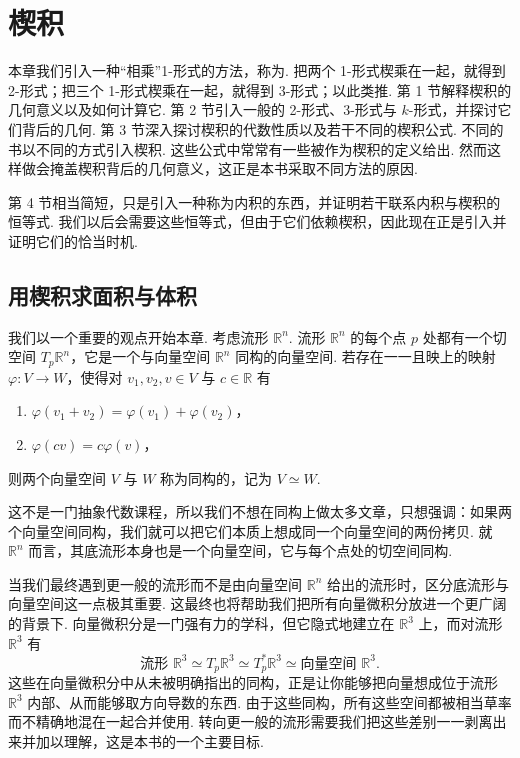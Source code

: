 \chapter{楔积}

本章我们引入一种``相乘''1-形式的方法，称为. 把两个 1-形式楔乘在一起，就得到 2-形式；把三个 1-形式楔乘在一起，就得到 3-形式；以此类推. 第 1 节解释楔积的几何意义以及如何计算它. 第 2 节引入一般的 2-形式、3-形式与 $k$-形式，并探讨它们背后的几何. 第 3 节深入探讨楔积的代数性质以及若干不同的楔积公式. 不同的书以不同的方式引入楔积. 这些公式中常常有一些被作为楔积的定义给出. 然而这样做会掩盖楔积背后的几何意义，这正是本书采取不同方法的原因.

第 4 节相当简短，只是引入一种称为内积的东西，并证明若干联系内积与楔积的恒等式. 我们以后会需要这些恒等式，但由于它们依赖楔积，因此现在正是引入并证明它们的恰当时机.

\section{用楔积求面积与体积}

我们以一个重要的观点开始本章. 考虑流形 $\mathbb{R}^n$. 流形 $\mathbb{R}^n$ 的每个点 $p$ 处都有一个切空间 $T_p\mathbb{R}^n$，它是一个与向量空间 $\mathbb{R}^n$ 同构的向量空间. 若存在一一且映上的映射 $\varphi:V\to W$，使得对 $v_1,v_2,v\in V$ 与 $c\in\mathbb{R}$ 有
\begin{enumerate}
  \item $\varphi(v_1+v_2)=\varphi(v_1)+\varphi(v_2)$，
  \item $\varphi(cv)=c\varphi(v)$，
\end{enumerate}
则两个向量空间 $V$ 与 $W$ 称为同构的，记为 $V\simeq W$.

这不是一门抽象代数课程，所以我们不想在同构上做太多文章，只想强调：如果两个向量空间同构，我们就可以把它们本质上想成同一个向量空间的两份拷贝. 就 $\mathbb{R}^n$ 而言，其底流形本身也是一个向量空间，它与每个点处的切空间同构.

当我们最终遇到更一般的流形而不是由向量空间 $\mathbb{R}^n$ 给出的流形时，区分底流形与向量空间这一点极其重要. 这最终也将帮助我们把所有向量微积分放进一个更广阔的背景下. 向量微积分是一门强有力的学科，但它隐式地建立在 $\mathbb{R}^3$ 上，而对流形 $\mathbb{R}^3$ 有
\[
\text{流形 }\mathbb{R}^3\simeq T_p\mathbb{R}^3\simeq T_p^*\mathbb{R}^3\simeq \text{向量空间 }\mathbb{R}^3.
\]
这些在向量微积分中从未被明确指出的同构，正是让你能够把向量想成位于流形 $\mathbb{R}^3$ 内部、从而能够取方向导数的东西. 由于这些同构，所有这些空间都被相当草率而不精确地混在一起合并使用. 转向更一般的流形需要我们把这些差别一一剥离出来并加以理解，这是本书的一个主要目标.

